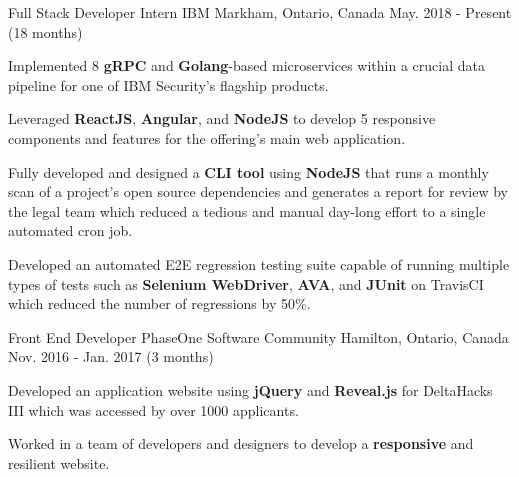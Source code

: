 


\begin{cventries}


\cventry
{Full Stack Developer Intern} %
{IBM} %
{Markham, Ontario, Canada} %
{May. 2018 - Present (18 months)} %
{ %
\begin{cvitems}
\item {Implemented 8 \textbf{gRPC} and \textbf{Golang}-based microservices within a crucial data pipeline for one of IBM Security's flagship products.}
\item {Leveraged \textbf{ReactJS}, \textbf{Angular}, and \textbf{NodeJS} to develop 5 responsive components and features for the offering's main web application.}
\item {Fully developed and designed a \textbf{CLI tool} using \textbf{NodeJS} that runs a monthly scan of a project's open source dependencies and generates a report for review by the legal team which reduced a tedious and manual day-long effort to a single automated cron job.}
\item {Developed an automated E2E regression testing suite capable of running multiple types of tests such as \textbf{Selenium WebDriver}, \textbf{AVA}, and \textbf{JUnit} on TravisCI which reduced the number of regressions by 50\%.}
\end{cvitems}
}


\cventry
{Front End Developer} %
{PhaseOne Software Community} %
{Hamilton, Ontario, Canada} %
{Nov. 2016 - Jan. 2017 (3 months)} %
{ %
\begin{cvitems}
\item {Developed an application website using \textbf{jQuery} and \textbf{Reveal.js} for DeltaHacks III which was accessed by over 1000 applicants.}
\item {Worked in a team of developers and designers to develop a \textbf{responsive} and resilient website.}
\end{cvitems}
}


\end{cventries}